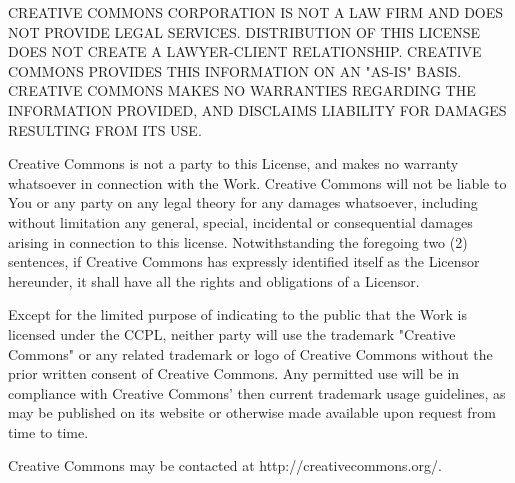 CREATIVE COMMONS CORPORATION IS NOT A LAW FIRM AND DOES NOT PROVIDE LEGAL SERVICES. DISTRIBUTION OF THIS LICENSE DOES NOT CREATE A LAWYER-CLIENT RELATIONSHIP. CREATIVE COMMONS PROVIDES THIS INFORMATION ON AN "AS-IS" BASIS. CREATIVE COMMONS MAKES NO WARRANTIES REGARDING THE INFORMATION PROVIDED, AND DISCLAIMS LIABILITY FOR DAMAGES RESULTING FROM ITS USE. 

Creative Commons is not a party to this License, and makes no warranty whatsoever in connection with the Work. Creative Commons will not be liable to You or any party on any legal theory for any damages whatsoever, including without limitation any general, special, incidental or consequential damages arising in connection to this license. Notwithstanding the foregoing two (2) sentences, if Creative Commons has expressly identified itself as the Licensor hereunder, it shall have all the rights and obligations of a Licensor.

Except for the limited purpose of indicating to the public that the Work is licensed under the CCPL, neither party will use the trademark "Creative Commons" or any related trademark or logo of Creative Commons without the prior written consent of Creative Commons. Any permitted use will be in compliance with Creative Commons' then current trademark usage guidelines, as may be published on its website or otherwise made available upon request from time to time.

Creative Commons may be contacted at http://creativecommons.org/.



